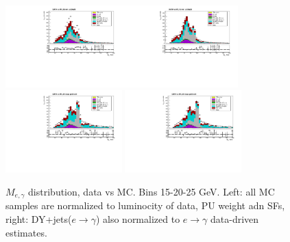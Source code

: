 \begin{figure}[htb]
\begin{center}
    \includegraphics[width=0.40\textwidth]{../figs/figs_v11/ELECTRON_WGamma/PrepareYields/c_TotalDATAvsMC_Barrel__Mpholep1PRELIMINARY_FOR_E_TO_GAMMA_WITH_PSV_CUT_pt20to25_.pdf}\includegraphics[width=0.40\textwidth]{../figs/figs_v11/ELECTRON_WGamma/PrepareYields/c_TotalDATAvsMC_Barrel__Mpholep1PRELIMINARY_FOR_E_TO_GAMMA_WITH_PSV_CUT_pt20to25__etogScale.pdf}\\
    \includegraphics[width=0.40\textwidth]{../figs/figs_v11/ELECTRON_WGamma/PrepareYields/c_TotalDATAvsMC_Endcap__Mpholep1PRELIMINARY_FOR_E_TO_GAMMA_WITH_PSV_CUT_pt20to25_.pdf} \includegraphics[width=0.40\textwidth]{../figs/figs_v11/ELECTRON_WGamma/PrepareYields/c_TotalDATAvsMC_Endcap__Mpholep1PRELIMINARY_FOR_E_TO_GAMMA_WITH_PSV_CUT_pt20to25__etogScale.pdf}\\
   \label{fig:Mpholep1DatavsMC_15to25}
  \caption{$M_{e,\gamma}$ distribution, data vs MC. Bins 15-20-25 GeV. Left: all MC samples are normalized to luminocity of data, PU weight adn SFs, right: DY+jets($e\rightarrow\gamma$) also normalized to $e\rightarrow\gamma$ data-driven estimates.}
  \end{center}
\end{figure}
